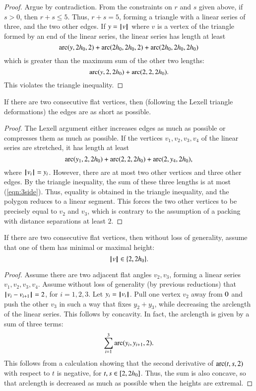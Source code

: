 \begin{proof}  Argue by contradiction.  From the constraints on $r$ and $s$ given above, if $s>0$, then $r+s\le 5$.  Thus, $r+s=5$, forming a triangle with a linear series of three, and the two other edges.  If $y={{\hskip0.1em|\hskip-0.15em|\hskip0.1em}v{\hskip0.1em|\hskip-0.15em|\hskip0.1em}}$ where $v$ is a vertex of the triangle formed by an end of the linear series, the linear series has length at least
$$
\operatorname{arc}(y,2{h_0},2)+\operatorname{arc}(2{h_0},2{h_0},2) +\operatorname{arc}(2{h_0},2{h_0},2{h_0})
$$
which is greater than the maximum sum of the other two lengths:
$$
\operatorname{arc}(y,2,2{h_0})+\operatorname{arc}(2,2,2{h_0}).
$$
This violates the triangle inequality.
\end{proof}

\begin{lemma}  If there are two consecutive flat vertices, then (following the Lexell triangle deformations) the edges are as short as possible.
\end{lemma}

\begin{proof} The Lexell argument either increases edges as much as possible or compresses them as much as possible.  If the vertices $v_1,v_2,v_3,v_4$ of the linear series are stretched, it has length at least
\begin{equation}\label{eqn:3side}
\operatorname{arc}(y_1,2,2{h_0})+\operatorname{arc}(2,2,2{h_0})+\operatorname{arc}(2,y_4,2{h_0}),
\end{equation}
where ${{\hskip0.1em|\hskip-0.15em|\hskip0.1em}v_i{\hskip0.1em|\hskip-0.15em|\hskip0.1em}}=y_i$.
However, there are at most two other vertices and three other edges.  By the triangle inequality, the sum of these three lengths is at most (\ref{eqn:3side}).
Thus, equality is obtained in the triangle inequality, and the polygon reduces to a linear segment.  This forces the two other vertices to be precisely equal to $v_2$ and $v_3$, which is contrary to the assumption of a packing with distance separations at least $2$.
\end{proof}

\begin{lemma} If there are two consecutive flat vertices, then without loss of generality,  assume that one of them has minimal or maximal height:
$${{\hskip0.1em|\hskip-0.15em|\hskip0.1em}v{\hskip0.1em|\hskip-0.15em|\hskip0.1em}}\in \{2,2{h_0}\}.$$
\end{lemma}

\begin{proof}
Assume there are two adjacent flat angles $v_2,v_3$, forming a linear series $v_1,v_2,v_3,v_4$.
Assume without loss of generality (by previous reductions) that
${\hskip0.1em|\hskip-0.15em|\hskip0.1em}v_i - v_{i+1}{\hskip0.1em|\hskip-0.15em|\hskip0.1em}=2$, for $i=1,2,3$.
Let $y_i = {{\hskip0.1em|\hskip-0.15em|\hskip0.1em}v_i{\hskip0.1em|\hskip-0.15em|\hskip0.1em}}$.
Pull one vertex $v_2$ away from $0$ and push the other $v_3$ in such a way that fixes $y_2+y_3$, while decreasing the arclength of the linear series.  This follows by concavity.
In fact, the arclength is given by a sum of three terms:
  $$
  \sum_{i=1}^3\operatorname{arc}(y_i,y_{i+1},2).
  $$
This follows from a calculation showing that the second derivative of $\operatorname{arc}(t,s,2)$ with respect to $t$ is negative, for $t,s\in[2,2{h_0}]$.  Thus, the
sum is also concave, so that arclength is decreased as much as possible when the heights are extremal.
\end{proof}

